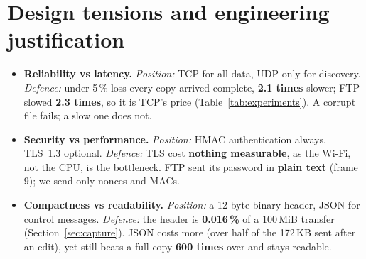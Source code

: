 \newpage
\section{Design tensions and engineering justification}
\label{sec:tensions}

\begin{itemize}[leftmargin=*,itemsep=1pt,topsep=2pt]
  \item \textbf{Reliability vs latency.} \emph{Position:} TCP for all data, UDP only for discovery.
  \emph{Defence:} under 5\,\% loss every copy arrived complete, \textbf{2.1 times} slower; FTP slowed
  \textbf{2.3 times}, so it is TCP's price (Table~\ref{tab:experiments}). A corrupt file fails; a slow one does not.
  \item \textbf{Security vs performance.} \emph{Position:} HMAC authentication always, TLS~1.3
  optional. \emph{Defence:} TLS cost \textbf{nothing measurable}, as the Wi-Fi, not the CPU, is the bottleneck.
  FTP sent its password in \textbf{plain text} (frame 9); we send only nonces and MACs.
  \item \textbf{Compactness vs readability.} \emph{Position:} a 12-byte binary header, JSON for
  control messages. \emph{Defence:} the header is \textbf{0.016\,\%} of a 100\,MiB transfer
  (Section~\ref{sec:capture}). JSON costs more (over half of the 172\,KB sent after an edit), yet still beats a full
  copy \textbf{600 times} over and stays readable.
\end{itemize}
